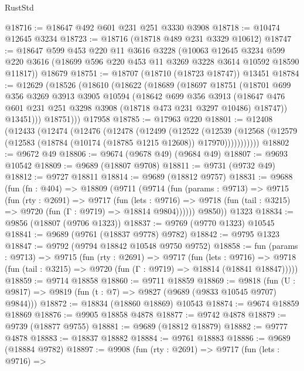 \begin{lexlean}{RustStd}
\begin{coremodule}
@18716 := @18647 @492 @601 @231 @251 @3330 @3908
@18718 := @10474 @12645 @3234
@18723 := @18716 (@18718 @489 @231 @3329 @10612)
@18747 := @18647
    @599
    @453
    @220
    @11
    @3616
    @3228
    (@10063
      @12645
      @3234
      @599
      @220
      @3616
      (@18699 @596 @220 @453 @11 @3269 @3228 @3614 @10592 @18590 @11817))
    @18679
@18751 := @18707 (@18710 (@18723 @18747)) @13451
@18784 := @12629
    (@18526
      (@18610
        (@18622
          (@18689
            (@18697
              @18751
              (@18701
                @699
                @356
                @3269
                @3913
                @3905
                @10594
                (@18642
                  @699
                  @356
                  @3913
                  (@18647 @476 @601 @231 @251 @3298 @3908 (@18718 @473 @231 @3297 @10486) @18747))
                @13451)))
          @18751)))
    @17958
@18785 := @17963 @220
@18801 := @12408
    (@12433
      (@12474
        (@12476
          (@12478
            (@12499
              (@12522
                (@12539
                  (@12568 (@12579 (@12583 (@18784 (@10174 (@18785 @1215 @12608)) @17970)))))))))))
@18802 := @9672 @49
@18806 := @9674 (@9678 @49) (@9684 @49)
@18807 := @9693 @10542
@18809 := @9689 (@18807 @9708)
@18811 := @9731 (@9732 @49)
@18812 := @9727 @18811
@18814 := @9689 (@18812 @9757)
@18831 := @9688
    (fun (fn : @404) =>
    @18809
      (@9711
        (@9714
          (fun (params : @9713) =>
          @9715
            (fun (rty : @2691) =>
            @9717
              (fun (lets : @9716) =>
              @9718 (fun (tail : @3215) => @9720 (fun (Γ : @9719) => @18814 @9804))))))
        @9850))
    @1323
@18834 := @9856 (@18807 (@9706 @1323))
@18837 := @9769 (@9770 @1323) @10545
@18841 := @9689 (@9761 (@18837 @9778) @9782)
@18842 := @9795 @1323
@18847 := @9792 (@9794 @18842 @10548 @9750 @9752)
@18858 := fun (params : @9713) =>
  @9715
    (fun (rty : @2691) =>
    @9717
      (fun (lets : @9716) =>
      @9718 (fun (tail : @3215) => @9720 (fun (Γ : @9719) => @18814 (@18841 @18847)))))
@18859 := @9714 @18858
@18860 := @9711 @18859
@18869 := @9818
    (fun (U : @9817) => @9819 (fun (t : @7) => @9827 (@9689 (@9833 @10545 @9707) @9844)))
@18872 := @18834 (@18860 @18869) @10543
@18874 := @9674 @18859 @18869
@18876 := @9905 @18858 @4878
@18877 := @9742 @4878
@18879 := @9739 (@18877 @9755)
@18881 := @9689 (@18812 @18879)
@18882 := @9777 @4878
@18883 := @18837 @18882
@18884 := @9761 @18883
@18886 := @9689 (@18884 @9782)
@18897 := @9908
    (fun (rty : @2691) =>
    @9717
      (fun (lets : @9716) =>

\end{coremodule}
\end{lexlean}
